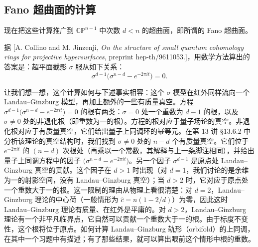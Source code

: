 \subsection{Fano 超曲面的计算}

现在把这些计算推广到 $\mathbb{CP}^{n-1}$ 中次数 $d<n$ 的超曲面，即所谓的 Fano 超曲面。

据 [A. Collino and M. Jinzenji, \emph{On the structure of small quantum cohomology rings for projective hypersurfaces}, preprint hep-th/9611053.]，用数学方法算出的答案是：超平面截影 $\sigma$ 服从如下关系：
\begin{equation}
  \tag{15.1}
  \label{eq:15-1}
  \sigma^{d-1}\bigl(\sigma^{n-d}-e^{-2\pi it}\bigr)=0.
\end{equation}

让我们想一想，这个计算如何与下述事实相容：这个 $\sigma$ 模型在红外同样流向一个 Landau--Ginzburg 模型，再加上额外的一些有质量真空。方程 $\sigma^{d-1}\bigl(\sigma^{n-d}-e^{-2\pi it}\bigr)=0$ 的根有两类：$\sigma=0$ 处一个重数为 $d-1$ 的根，以及 $\sigma\ne0$ 处的非退化根（即重数为一的根）。方程的根对应于量子场论的真空。非退化根对应于有质量真空，它们给出量子上同调环的幂等元。在第 13 讲 §13.6.2 中分析该理论的真空结构时，我们找到 $\sigma\ne0$ 处的 $n-d$ 个有质量真空。它们位于 $e^{-2\pi it}$ 的 $(n-d)$ 次根处（再乘以一个常数，其解释与上一条脚注相同），并给出量子上同调方程中的因子 $\bigl(\sigma^{n-d}-e^{-2\pi it}\bigr)$。另一个因子 $\sigma^{d-1}$ 是原点处 Landau--Ginzburg 真空的贡献。这个因子在 $d>1$ 时出现（对 $d=1$，我们讨论的是余维为一的射影空间，没有 Landau--Ginzburg 真空）；当 $d>2$ 时，它对应于原点处一个重数大于一的根。这一限制的理由从物理上看很清楚：对 $d=2$，Landau--Ginzburg 理论的中心荷（一般情形为 $\hat c=n(1-2/d)$）为零，因此这时 Landau--Ginzburg 理论有质量、在红外是平庸的。对 $d>2$，Landau--Ginzburg 理论有一个非平凡临界点，它自然可以贡献一个重数大于一的根。由于标度不变性，这个根将位于原点。如何计算 Landau--Ginzburg 轨形（orbifold）的上同调，在其中一个习题中有描述；有了那些结果，就可以算出眼前这个情形中根的重数。


